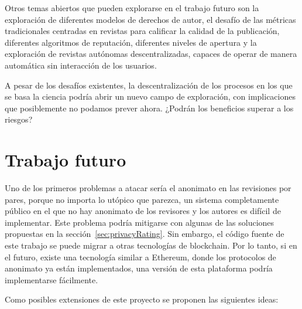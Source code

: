 Otros temas abiertos que pueden explorarse en el trabajo futuro son la
exploración de diferentes modelos de derechos de autor, el desafío de las
métricas tradicionales centradas en revistas para calificar la calidad de la
publicación, diferentes algoritmos de reputación, diferentes niveles de apertura
y la exploración de revistas autónomas descentralizadas, capaces de operar de
manera automática sin interacción de los usuarios.

A pesar de los desafíos existentes, la descentralización de los procesos en los
que se basa la ciencia podría abrir un nuevo campo de exploración, con
implicaciones que posiblemente no podamos prever ahora. ¿Podrán los beneficios
superar a los riesgos?


\section{Trabajo futuro}

Uno de los primeros problemas a atacar sería el anonimato en las revisiones por
pares, porque no importa lo utópico que parezca, un sistema completamente
público en el que no hay anonimato de los revisores y los autores es difícil de
implementar. Este problema podría mitigarse con algunas de las soluciones
propuestas en la sección~\ref{sec:privacyRating}. Sin embargo, el código fuente
de este trabajo se puede migrar a otras tecnologías de blockchain. Por lo tanto,
si en el futuro, existe una tecnología similar a Ethereum, donde los protocolos
de anonimato ya están implementados, una versión de esta plataforma podría
implementarse fácilmente.


Como posibles extensiones de este proyecto se proponen las siguientes ideas:

